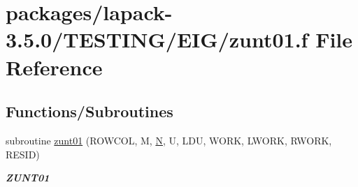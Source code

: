 \hypertarget{zunt01_8f}{}\section{packages/lapack-\/3.5.0/\+T\+E\+S\+T\+I\+N\+G/\+E\+I\+G/zunt01.f File Reference}
\label{zunt01_8f}
\subsection*{Functions/\+Subroutines}
\begin{DoxyCompactItemize}
\item 
subroutine \hyperlink{group__complex16__eig_gac8d92ee1ea8c00830b42ebf4017a2ae3}{zunt01} (R\+O\+W\+C\+O\+L, M, \hyperlink{polmisc_8c_a0240ac851181b84ac374872dc5434ee4}{N}, U, L\+D\+U, W\+O\+R\+K, L\+W\+O\+R\+K, R\+W\+O\+R\+K, R\+E\+S\+I\+D)
\begin{DoxyCompactList}\small\item\em {\bfseries Z\+U\+N\+T01} \end{DoxyCompactList}\end{DoxyCompactItemize}
